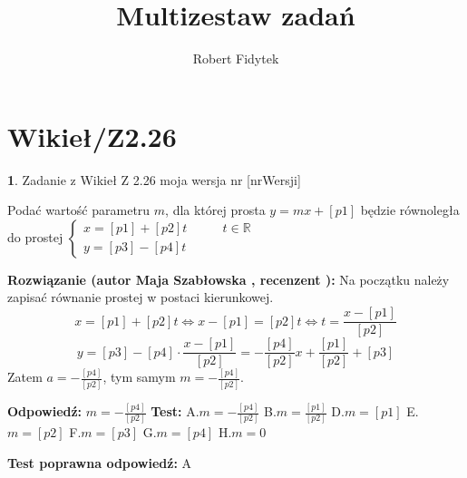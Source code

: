 \documentclass[12pt, a4paper]{article}
\title{Multizestaw zadań}
\author{Robert Fidytek}
\date{}
\theoremstyle{definition} %
\newtheorem{zad}{}
\newcommand{\kategoria}[1]{\section{#1}} %
\newcommand{\zadStart}[1]{\begin{zad}#1\newline} %
\newcommand{\zadStop}{\end{zad}}   %
\newcommand{\rozwStart}[2]{\noindent \textbf{Rozwiązanie (autor #1 , recenzent #2): }\newline} %
\newcommand{\rozwStop}{\newline}                                            %
\newcommand{\odpStart}{\noindent \textbf{Odpowiedź:}\newline}    %
\newcommand{\odpStop}{\newline}                                             %
\newcommand{\testStart}{\noindent \textbf{Test:}\newline} %
\newcommand{\testStop}{\newline} %
\newcommand{\kluczStart}{\noindent \textbf{Test poprawna odpowiedź:}\newline} %
\newcommand{\kluczStop}{\newline} %
\begin{document}
\maketitle


\kategoria{Wikieł/Z2.26}
\zadStart{Zadanie z Wikieł Z 2.26 moja wersja nr [nrWersji]}

Podać wartość parametru $m$, dla której prosta $y=mx+[p1]$ będzie równoległa do prostej $\left\{ \begin{array}{ll}
x=[p1]+[p2]t & \quad \quad t\in\mathbb{R}\\
y=[p3]-[p4]t
\end{array} \right.$

\zadStop

\rozwStart{Maja Szabłowska}{}
Na początku należy zapisać równanie prostej w postaci kierunkowej.
$$x=[p1]+[p2]t \iff x-[p1]=[p2]t \iff t=\frac{x-[p1]}{[p2]}$$
$$y=[p3]-[p4]\cdot\frac{x-[p1]}{[p2]}=-\frac{[p4]}{[p2]}x+\frac{[p1]}{[p2]}+[p3]$$
Zatem $a=-\frac{[p4]}{[p2]}$, tym samym $m=-\frac{[p4]}{[p2]}.$


\rozwStop


\odpStart
$m=-\frac{[p4]}{[p2]}$
\odpStop
\testStart
A.$m=-\frac{[p4]}{[p2]}$
B.$m=\frac{[p1]}{[p2]}$
D.$m=[p1]$
E.$m=[p2]$
F.$m=[p3]$
G.$m=[p4]$
H.$m=0$

\testStop
\kluczStart
A
\kluczStop
\end{document}
